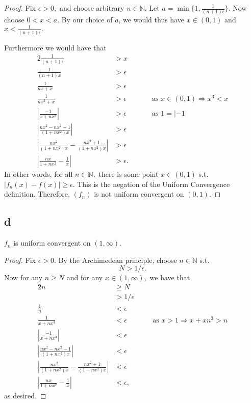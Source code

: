 \documentclass[10pt]{article}
\begin{document}
\begin{proof}
    Fix $\epsilon>0,$ and choose arbitrary $n\in\mathbb{N}.$ Let $a=\min\{1, \frac{1}{(n+1)\epsilon}\}.$ Now choose $0<x<a.$ By our choice of $a$, we would thus have $x\in(0,1)$ and $x<\frac{1}{(n+1)\epsilon}.$
    
    Furthermore we would have that
    \begin{alignat*}{2}
        \frac{1}{(n+1)\epsilon}&> x\\
        \frac{1}{(n+1)x}&>\epsilon\\
        \frac{1}{nx+x} &>\epsilon\\
        \frac{1}{nx^3+x} &>\epsilon \qquad&&\text{as $x\in(0,1)\Rightarrow x^3<x$}\\
        \left | \frac{-1}{x+nx^3}\right | &> \epsilon &&\text{as $1= |-1|$}\\
        \left | \frac{nx^2-nx^2-1}{(1+nx^2)x} \right |&>\epsilon\\
        \left | \frac{nx^2}{(1+nx^2)x}-\frac{nx^2+1}{(1+nx^2)x}\right | &>\epsilon\\
        \left | \frac{nx}{1+nx^2} - \frac{1}{x} \right | &>\epsilon.
    \end{alignat*}
    In other words, for all $n\in\mathbb{N},$ there is some point $x\in (0,1)$ s.t. $|f_n(x)-f(x)|\ge \epsilon.$ This is the negation of the Uniform Convergence definition. Therefore, $(f_n)$ is not uniform convergent on $(0,1).$
\end{proof}

\subsection*{d}

$f_n$ is uniform convergent on $(1,\infty).$

\begin{proof}
    Fix $\epsilon>0.$ By the Archimedean principle, choose $n\in\mathbb{N}$ s.t.
    \[N>1/\epsilon.\]
    Now for any $n\ge N$ and for any $x\in(1,\infty),$ we have that
    \begin{alignat*}{2}
        n &\ge N\\
        &> 1/\epsilon\\
        \frac{1}{n}&<\epsilon\\
        \frac{1}{x+nx^3}&<\epsilon \qquad&&\text{as $x>1 \Rightarrow x+xn^3 > n$}\\
        \left | \frac{-1}{x+nx^3}\right | &< \epsilon \\
        \left | \frac{nx^2-nx^2-1}{(1+nx^2)x} \right |&<\epsilon \\
        \left | \frac{nx^2}{(1+nx^2)x}-\frac{nx^2+1}{(1+nx^2)x}\right | &<\epsilon\\
        \left | \frac{nx}{1+nx^2} - \frac{1}{x} \right | &<\epsilon,
    \end{alignat*}
    as desired.
\end{proof}
\end{document}
